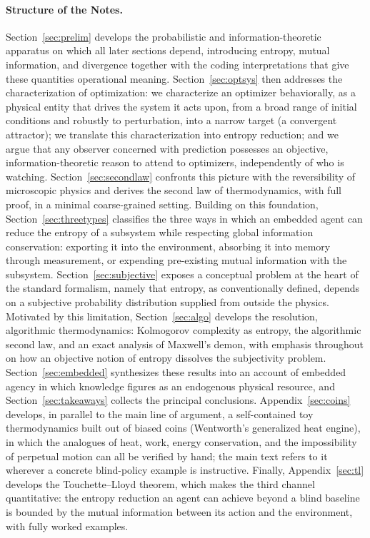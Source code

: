 \documentclass[11pt]{article}
\begin{document}
\paragraph{Structure of the Notes.} Section~\ref{sec:prelim} develops the probabilistic and information-theoretic apparatus on which all later sections depend, introducing entropy, mutual information, and divergence together with the coding interpretations that give these quantities operational meaning. Section~\ref{sec:optsys} then addresses the characterization of optimization: we characterize an optimizer behaviorally, as a physical entity that drives the system it acts upon, from a broad range of initial conditions and robustly to perturbation, into a narrow target (a convergent attractor); we translate this characterization into entropy reduction; and we argue that any observer concerned with prediction possesses an objective, information-theoretic reason to attend to optimizers, independently of who is watching. Section~\ref{sec:secondlaw} confronts this picture with the reversibility of microscopic physics and derives the second law of thermodynamics, with full proof, in a minimal coarse-grained setting. Building on this foundation, Section~\ref{sec:threetypes} classifies the three ways in which an embedded agent can reduce the entropy of a subsystem while respecting global information conservation: exporting it into the environment, absorbing it into memory through measurement, or expending pre-existing mutual information with the subsystem. Section~\ref{sec:subjective} exposes a conceptual problem at the heart of the standard formalism, namely that entropy, as conventionally defined, depends on a subjective probability distribution supplied from outside the physics. Motivated by this limitation, Section~\ref{sec:algo} develops the resolution, algorithmic thermodynamics: Kolmogorov complexity as entropy, the algorithmic second law, and an exact analysis of Maxwell's demon, with emphasis throughout on how an objective notion of entropy dissolves the subjectivity problem. Section~\ref{sec:embedded} synthesizes these results into an account of embedded agency in which knowledge figures as an endogenous physical resource, and Section~\ref{sec:takeaways} collects the principal conclusions. Appendix~\ref{sec:coins} develops, in parallel to the main line of argument, a self-contained toy thermodynamics built out of biased coins (Wentworth's generalized heat engine), in which the analogues of heat, work, energy conservation, and the impossibility of perpetual motion can all be verified by hand; the main text refers to it wherever a concrete blind-policy example is instructive. Finally, Appendix~\ref{sec:tl} develops the Touchette--Lloyd theorem, which makes the third channel quantitative: the entropy reduction an agent can achieve beyond a blind baseline is bounded by the mutual information between its action and the environment, with fully worked examples.
\end{document}
